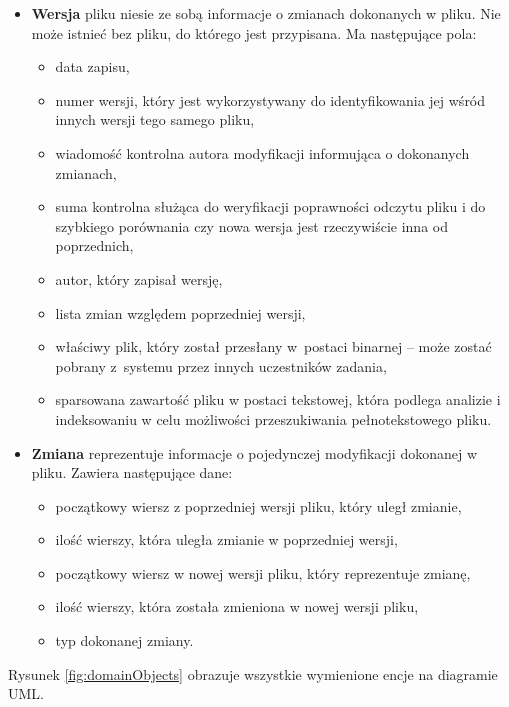 \begin{itemize}
    \item \textbf{Wersja} pliku niesie ze sobą informacje o zmianach dokonanych w pliku.
    Nie może istnieć bez pliku, do którego jest przypisana.
    Ma następujące pola:
    \begin{itemize}
        \item data zapisu,
        \item numer wersji, który jest wykorzystywany do identyfikowania jej wśród innych wersji tego samego pliku,
        \item wiadomość kontrolna autora modyfikacji informująca o dokonanych zmianach,
        \item suma kontrolna służąca do weryfikacji poprawności odczytu pliku i do szybkiego porównania czy nowa wersja jest rzeczywiście inna od poprzednich,
        \item autor, który zapisał wersję,
        \item lista zmian względem poprzedniej wersji,
        \item właściwy plik, który został przesłany w~postaci binarnej -- może zostać pobrany z~systemu przez innych uczestników zadania,
        \item sparsowana zawartość pliku w postaci tekstowej, która podlega analizie i indeksowaniu w celu możliwości przeszukiwania pełnotekstowego pliku.
    \end{itemize}
    
    \item \textbf{Zmiana} reprezentuje informacje o pojedynczej modyfikacji dokonanej w pliku.
    Zawiera następujące dane:
    \begin{itemize}
        \item początkowy wiersz z poprzedniej wersji pliku, który uległ zmianie,
        \item ilość wierszy, która uległa zmianie w poprzedniej wersji,
        \item początkowy wiersz w nowej wersji pliku, który reprezentuje zmianę,
        \item ilość wierszy, która została zmieniona w nowej wersji pliku,
        \item typ dokonanej zmiany.
    \end{itemize}
\end{itemize}

Rysunek \ref{fig:domainObjects} obrazuje wszystkie wymienione encje na diagramie UML.

